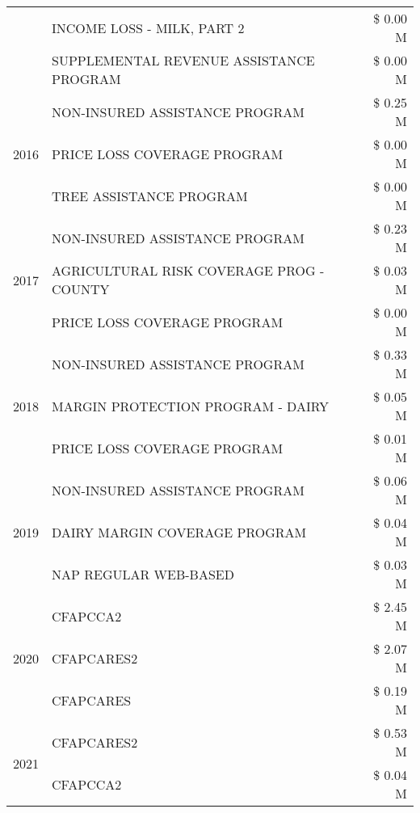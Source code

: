 \begin{tabular}{llr}
 & INCOME LOSS - MILK, PART 2 & \$ 0.00 M \\
 & SUPPLEMENTAL REVENUE ASSISTANCE PROGRAM & \$ 0.00 M \\
\cline{1-3}
\multirow[t]{3}{*}{2016} & NON-INSURED ASSISTANCE PROGRAM                & \$ 0.25 M \\
 & PRICE LOSS COVERAGE PROGRAM                   & \$ 0.00 M \\
 & TREE ASSISTANCE PROGRAM                       & \$ 0.00 M \\
\cline{1-3}
\multirow[t]{3}{*}{2017} & NON-INSURED ASSISTANCE PROGRAM & \$ 0.23 M \\
 & AGRICULTURAL RISK COVERAGE PROG - COUNTY & \$ 0.03 M \\
 & PRICE LOSS COVERAGE PROGRAM & \$ 0.00 M \\
\cline{1-3}
\multirow[t]{3}{*}{2018} & NON-INSURED ASSISTANCE PROGRAM & \$ 0.33 M \\
 & MARGIN PROTECTION PROGRAM - DAIRY & \$ 0.05 M \\
 & PRICE LOSS COVERAGE PROGRAM & \$ 0.01 M \\
\cline{1-3}
\multirow[t]{3}{*}{2019} & NON-INSURED ASSISTANCE PROGRAM & \$ 0.06 M \\
 & DAIRY MARGIN COVERAGE PROGRAM & \$ 0.04 M \\
 & NAP REGULAR WEB-BASED & \$ 0.03 M \\
\cline{1-3}
\multirow[t]{3}{*}{2020} & CFAPCCA2 & \$ 2.45 M \\
 & CFAPCARES2 & \$ 2.07 M \\
 & CFAPCARES & \$ 0.19 M \\
\cline{1-3}
\multirow[t]{2}{*}{2021} & CFAPCARES2 & \$ 0.53 M \\
 & CFAPCCA2 & \$ 0.04 M \\
\cline{1-3}
\bottomrule
\end{tabular}
